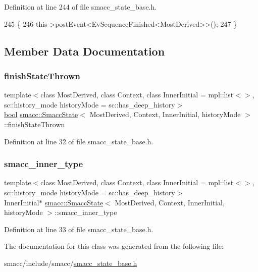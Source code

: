 Definition at line 244 of file smacc\+\_\+state\+\_\+base.\+h.


\begin{DoxyCode}
245   \{
246     this->postEvent<EvSequenceFinished<MostDerived>>();
247   \}
\end{DoxyCode}


\subsection{Member Data Documentation}
\mbox{\label{classsmacc_1_1SmaccState_a6c40f733c35ddfb9ae2a2f8e9bab07d3}} 
\subsubsection{\texorpdfstring{finish\+State\+Thrown}{finishStateThrown}}
{\footnotesize\ttfamily template$<$class Most\+Derived, class Context, class Inner\+Initial = mpl\+::list$<$$>$, sc\+::history\+\_\+mode history\+Mode = sc\+::has\+\_\+deep\+\_\+history$>$ \\
\hyperlink{classbool}{bool} \hyperlink{classsmacc_1_1SmaccState}{smacc\+::\+Smacc\+State}$<$ Most\+Derived, Context, Inner\+Initial, history\+Mode $>$\+::finish\+State\+Thrown}



Definition at line 32 of file smacc\+\_\+state\+\_\+base.\+h.

\mbox{\label{classsmacc_1_1SmaccState_a087d0f66729b98614feb8c59ea548af1}} 
\subsubsection{\texorpdfstring{smacc\+\_\+inner\+\_\+type}{smacc\_inner\_type}}
{\footnotesize\ttfamily template$<$class Most\+Derived, class Context, class Inner\+Initial = mpl\+::list$<$$>$, sc\+::history\+\_\+mode history\+Mode = sc\+::has\+\_\+deep\+\_\+history$>$ \\
Inner\+Initial$\ast$ \hyperlink{classsmacc_1_1SmaccState}{smacc\+::\+Smacc\+State}$<$ Most\+Derived, Context, Inner\+Initial, history\+Mode $>$\+::smacc\+\_\+inner\+\_\+type}



Definition at line 33 of file smacc\+\_\+state\+\_\+base.\+h.



The documentation for this class was generated from the following file\+:\begin{DoxyCompactItemize}
\item 
smacc/include/smacc/\hyperlink{smacc__state__base_8h}{smacc\+\_\+state\+\_\+base.\+h}\end{DoxyCompactItemize}
